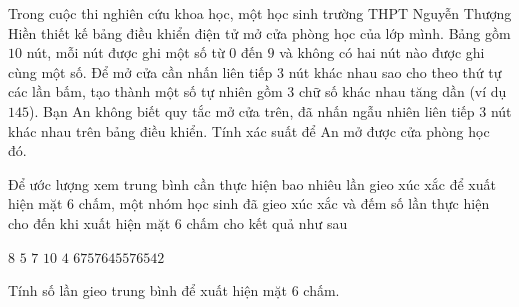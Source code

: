 \begin{bt}%
	Trong cuộc thi nghiên cứu khoa học, một học sinh trường THPT Nguyễn Thượng Hiền thiết kế bảng điều khiển điện tử mở cửa phòng học của lớp mình. Bảng gồm $10$ nút, mỗi nút được ghi một số từ $0$ đến $9$ và không có hai nút nào được ghi cùng một số. Để mở cửa cần nhấn liên tiếp $3$ nút khác nhau sao cho theo thứ tự các lần bấm, tạo thành một số tự nhiên gồm $3$ chữ số khác nhau tăng dần (ví dụ $145$). Bạn An không biết quy tắc mở cửa trên, đã nhấn ngẫu nhiên liên tiếp $3$ nút khác nhau trên bảng điều khiển. Tính xác suất để An mở được cửa phòng học đó.
\end{bt}

\begin{bt}%
	Để ước lượng xem trung bình cần thực hiện bao nhiêu lần gieo xúc xắc để xuất hiện mặt $6$ chấm, một nhóm học sinh đã gieo xúc xắc và đếm số lần thực hiện cho đến khi xuất hiện mặt $6$ chấm cho kết quả như sau
	\begin{center}
		$8$ \quad $5$ \quad $7$ \quad $10$ \quad $4$ \quad $6$\quad $7$\quad $5$\quad $7$\quad $6$\quad $4$\quad $5$\quad $5$\quad $7$\quad $6$\quad $5$\quad $4$\quad $2$
	\end{center}
	Tính số lần gieo trung bình để xuất hiện mặt $6$ chấm.
\end{bt}

